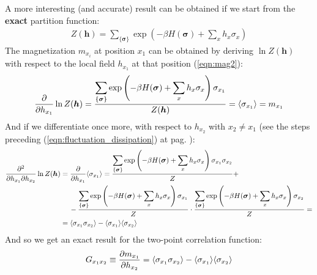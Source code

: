 \documentclass[../../main.tex]{subfiles}
\begin{document}
A more interesting (and accurate) result can be obtained if we start from the \textbf{exact} partition function:
\begin{align*}
    Z(\bm{h}) = \sum_{\{\bm{\sigma}\}} \exp\left({-\beta H(\bm{\sigma}) + \sum_x h_x \sigma_x }\right)
\end{align*}
The magnetization $m_{x_i}$ at position $x_1$ can be obtained by deriving $\ln Z(\bm{h})$ with respect to the local field $h_{x_1}$ at that position (\ref{eqn:mag2}):
\begin{align*}
    \pdv{h_{x_1}} \ln Z(\bm{h}) = \frac{\displaystyle \sum_{\{\bm{\sigma}\}} \exp\left(-\beta H(\bm{\sigma}) + \sum_x h_x \sigma_x\right) \sigma_{x_1}}{Z(\bm{h})} = \langle \sigma_{x_1} \rangle = m_{x_1}
\end{align*}
And if we differentiate once more, with respect to $h_{x_2}$ with $x_2 \neq x_1$ (see the steps preceding (\ref{eqn:fluctuation_dissipation}) at pag. \pageref{eqn:fluctuation_dissipation}):
\begin{align*}
    \pdv[2]{}{h_{x_1}}{h_{x_2}} \ln Z(\bm{h}) &= \pdv{h_{x_1}} \langle \sigma_{x_1} \rangle = \frac{\displaystyle \sum_{\{\bm{\sigma}\}} \exp\left(-\beta H(\bm{\sigma}) + \sum_x h_x \sigma_x\right) \sigma_{x_1} \sigma_{x_2}}{Z} + \\
    &\quad \> -  \frac{\displaystyle \sum_{\{\bm{\sigma}\}} \exp\left(-\beta H(\bm{\sigma}) + \sum_x h_x \sigma_x\right) \sigma_{x_1}}{Z} \cdot \frac{\displaystyle \sum_{\{\bm{\sigma}\}} \exp\left(-\beta H(\bm{\sigma}) + \sum_x h_x \sigma_x\right) \sigma_{x_2}}{Z} =\\
    &= \langle \sigma_{x_1} \sigma_{x_2} \rangle - \langle \sigma_{x_1} \rangle \langle \sigma_{x_2} \rangle
\end{align*}
And so we get an exact result for the two-point correlation function:
\begin{align}\label{eqn:twop}
    G_{x_1 x_2} \equiv \pdv{m_{x_1}}{h_{x_2}} = \langle \sigma_{x_1}  \sigma_{x_2}\rangle - \langle \sigma_{x_1} \rangle \langle \sigma_{x_2} \rangle
\end{align}
\end{document}
